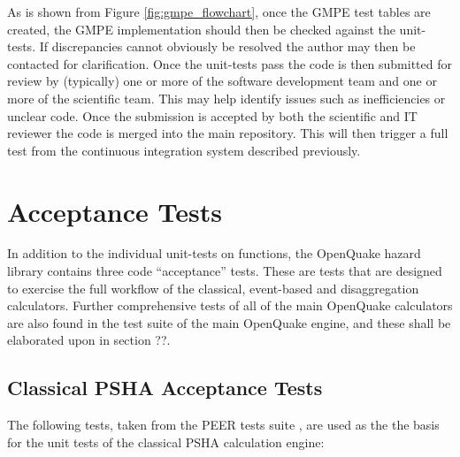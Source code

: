 As is shown from Figure \ref{fig:gmpe_flowchart}, once the GMPE test tables are created, the GMPE implementation should then be checked against the unit-tests. If discrepancies cannot obviously be resolved the author may then be contacted for clarification. Once the unit-tests pass the code is then submitted for review by (typically) one or more of the software development team and one or more of the scientific team. This may help identify issues such as inefficiencies or unclear code. Once the submission is accepted by both the scientific and IT reviewer the code is merged into the main repository. This will then trigger a full test from the continuous integration system described previously.


\section{Acceptance Tests}

In addition to the individual unit-tests on functions, the OpenQuake hazard library contains three code ``acceptance'' tests. These are tests that are designed to exercise the full workflow of the classical, event-based and disaggregation calculators. Further comprehensive tests of all of the main OpenQuake calculators are also found in the test suite of the main OpenQuake engine, and these shall be elaborated upon in section ??.

\subsection{Classical PSHA Acceptance Tests}

The following tests, taken from the PEER tests suite \citep{thomas2010}, are used as the the basis for the unit tests of the classical PSHA calculation engine:

